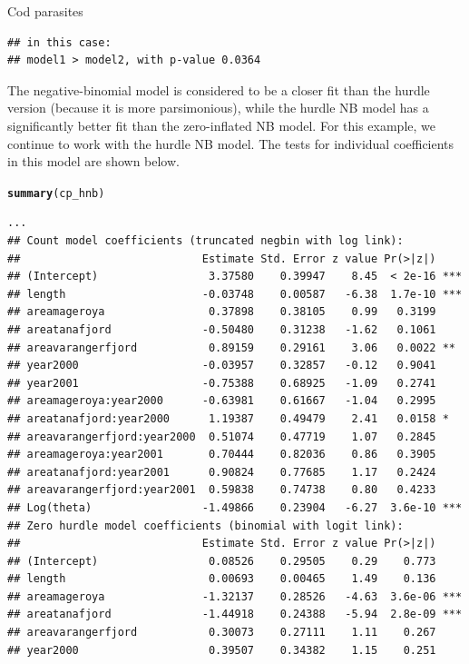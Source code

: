 \documentclass[11pt]{book}\usepackage[]{graphicx}\usepackage[]{color}
\makeatletter
\newcommand{\hlstd}[1]{\textcolor[rgb]{0.345,0.345,0.345}{#1}}%
\newcommand{\hlkwd}[1]{\textcolor[rgb]{0.737,0.353,0.396}{\textbf{#1}}}%
\newenvironment{kframe}{%
 \def\at@end@of@kframe{}%
 \ifinner\ifhmode%
  \def\at@end@of@kframe{\end{minipage}}%
  \begin{minipage}{\columnwidth}%
 \fi\fi%
 \def\FrameCommand##1{\hskip\@totalleftmargin \hskip-\fboxsep
 \colorbox{shadecolor}{##1}\hskip-\fboxsep
     \hskip-\linewidth \hskip-\@totalleftmargin \hskip\columnwidth}%
 \MakeFramed {\advance\hsize-\width
   \@totalleftmargin\z@ \linewidth\hsize
   \@setminipage}}%
 {\par\unskip\endMakeFramed%
 \at@end@of@kframe}
\newenvironment{knitrout}{}{} %
\renewenvironment{knitrout}{\small\renewcommand{\baselinestretch}{.85}}{} %
\makeatother
\begin{document}
\begin{Example}[cod2]{Cod parasites}
\begin{knitrout}
\begin{kframe}
\begin{verbatim}
## in this case:
## model1 > model2, with p-value 0.0364
\end{verbatim}
\end{kframe}
\end{knitrout}
The negative-binomial model is considered to be a closer fit
than the hurdle version (because it is more parsimonious),
while the hurdle NB model has a significantly better fit than the zero-inflated
NB model.  For this example, we continue to work with the hurdle NB model.
The tests for individual coefficients in this model are shown below.
\begin{knitrout}\footnotesize
{}\color{fgcolor}\begin{kframe}
\begin{alltt}
\hlkwd{summary}\hlstd{(cp_hnb)}
\end{alltt}
\begin{verbatim}
...
## Count model coefficients (truncated negbin with log link):
##                            Estimate Std. Error z value Pr(>|z|)    
## (Intercept)                 3.37580    0.39947    8.45  < 2e-16 ***
## length                     -0.03748    0.00587   -6.38  1.7e-10 ***
## areamageroya                0.37898    0.38105    0.99   0.3199    
## areatanafjord              -0.50480    0.31238   -1.62   0.1061    
## areavarangerfjord           0.89159    0.29161    3.06   0.0022 ** 
## year2000                   -0.03957    0.32857   -0.12   0.9041    
## year2001                   -0.75388    0.68925   -1.09   0.2741    
## areamageroya:year2000      -0.63981    0.61667   -1.04   0.2995    
## areatanafjord:year2000      1.19387    0.49479    2.41   0.0158 *  
## areavarangerfjord:year2000  0.51074    0.47719    1.07   0.2845    
## areamageroya:year2001       0.70444    0.82036    0.86   0.3905    
## areatanafjord:year2001      0.90824    0.77685    1.17   0.2424    
## areavarangerfjord:year2001  0.59838    0.74738    0.80   0.4233    
## Log(theta)                 -1.49866    0.23904   -6.27  3.6e-10 ***
## Zero hurdle model coefficients (binomial with logit link):
##                            Estimate Std. Error z value Pr(>|z|)    
## (Intercept)                 0.08526    0.29505    0.29    0.773    
## length                      0.00693    0.00465    1.49    0.136    
## areamageroya               -1.32137    0.28526   -4.63  3.6e-06 ***
## areatanafjord              -1.44918    0.24388   -5.94  2.8e-09 ***
## areavarangerfjord           0.30073    0.27111    1.11    0.267    
## year2000                    0.39507    0.34382    1.15    0.251    

\end{verbatim}
\end{kframe}
\end{knitrout}
\end{Example}
\end{document}
